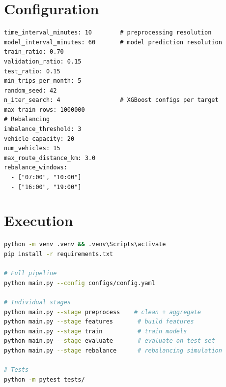 \documentclass[12pt,a4paper]{report}
\begin{document}
\chapter{Configuration}

\begin{lstlisting}[language={},caption={Key configuration
(\texttt{configs/config.yaml})},label={lst:config}]
time_interval_minutes: 10        # preprocessing resolution
model_interval_minutes: 60       # model prediction resolution
train_ratio: 0.70
validation_ratio: 0.15
test_ratio: 0.15
min_trips_per_month: 5
random_seed: 42
n_iter_search: 4                 # XGBoost configs per target
max_train_rows: 1000000
# Rebalancing
imbalance_threshold: 3
vehicle_capacity: 20
num_vehicles: 15
max_route_distance_km: 3.0
rebalance_windows:
  - ["07:00", "10:00"]
  - ["16:00", "19:00"]
\end{lstlisting}

\chapter{Execution}

\begin{lstlisting}[language=bash,caption={Running the pipeline},label={lst:run}]
python -m venv .venv && .venv\Scripts\activate
pip install -r requirements.txt

# Full pipeline
python main.py --config configs/config.yaml

# Individual stages
python main.py --stage preprocess    # clean + aggregate
python main.py --stage features       # build features
python main.py --stage train          # train models
python main.py --stage evaluate       # evaluate on test set
python main.py --stage rebalance      # rebalancing simulation

# Tests
python -m pytest tests/
\end{lstlisting}
\end{document}
